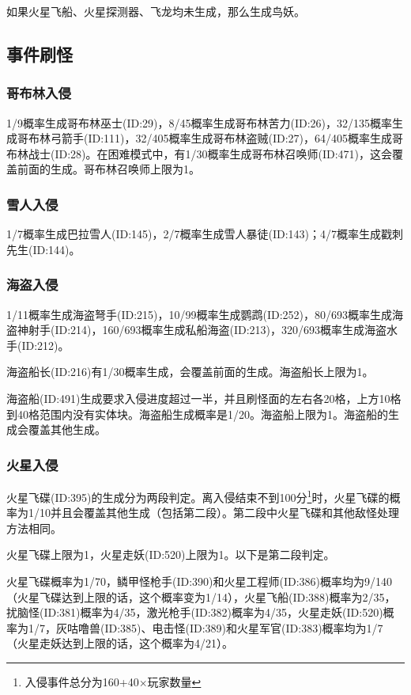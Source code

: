 如果火星飞船、火星探测器、飞龙均未生成，那么生成鸟妖。

\subsection{事件刷怪}
\subsubsection{哥布林入侵}
1/9概率生成哥布林巫士(ID:29)，8/45概率生成哥布林苦力(ID:26)，32/135概率生成哥布林弓箭手(ID:111)，32/405概率生成哥布林盗贼(ID:27)，64/405概率生成哥布林战士(ID:28)。在困难模式中，有1/30概率生成哥布林召唤师(ID:471)，这会覆盖前面的生成。哥布林召唤师上限为1。

\subsubsection{雪人入侵}
1/7概率生成巴拉雪人(ID:145)，2/7概率生成雪人暴徒(ID:143)；4/7概率生成戳刺先生(ID:144)。

\subsubsection{海盗入侵}
1/11概率生成海盗弩手(ID:215)，10/99概率生成鹦鹉(ID:252)，80/693概率生成海盗神射手(ID:214)，160/693概率生成私船海盗(ID:213)，320/693概率生成海盗水手(ID:212)。

海盗船长(ID:216)有1/30概率生成，会覆盖前面的生成。海盗船长上限为1。

海盗船(ID:491)生成要求入侵进度超过一半，并且刷怪面的左右各20格，上方10格到40格范围内没有实体块。海盗船生成概率是1/20。海盗船上限为1。海盗船的生成会覆盖其他生成。

\subsubsection{火星入侵}
火星飞碟(ID:395)的生成分为两段判定。离入侵结束不到100分\footnote{入侵事件总分为160+40$\times$玩家数量}时，火星飞碟的概率为1/10并且会覆盖其他生成（包括第二段）。第二段中火星飞碟和其他敌怪处理方法相同。

火星飞碟上限为1，火星走妖(ID:520)上限为1。以下是第二段判定。

火星飞碟概率为1/70，鳞甲怪枪手(ID:390)和火星工程师(ID:386)概率均为9/140（火星飞碟达到上限的话，这个概率变为1/14），火星飞船(ID:388)概率为2/35，扰脑怪(ID:381)概率为4/35，激光枪手(ID:382)概率为4/35，火星走妖(ID:520)概率为1/7，灰咕噜兽(ID:385)、电击怪(ID:389)和火星军官(ID:383)概率均为1/7（火星走妖达到上限的话，这个概率为4/21）。


